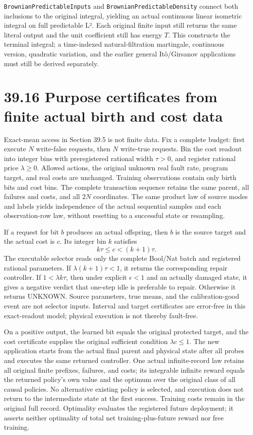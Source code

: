 \documentclass[
  english,
  11pt,
  oneside]{book}
\begin{document}
\nolinkurl{BrownianPredictableInputs} and \nolinkurl{BrownianPredictableDensity} connect both inclusions to the original integral, yielding an actual continuous linear isometric integral on full predictable L². Each original finite input still returns the same literal output and the unit coefficient still has energy \(T\). This constructs the terminal integral; a time-indexed natural-filtration martingale, continuous version, quadratic variation, and the earlier general Itô/Girsanov applications must still be derived separately.

\section{39.16 Purpose certificates from finite actual birth and cost data}\label{purpose-certificates-from-finite-actual-birth-and-cost-data}

Exact-mean access in Section 39.5 is not finite data. Fix a complete budget: first execute \(N\) write-false requests, then \(N\) write-true requests. Bin the cost readout into integer bins with preregistered rational width \(\tau>0\), and register rational price \(\lambda\ge0\). Allowed actions, the original unknown real fault rate, program target, and real costs are unchanged. Training observations contain only birth bits and cost bins. The complete transaction sequence retains the same parent, all failures and costs, and all \(2N\) coordinates. The same product law of source modes and labels yields independence of the actual sequential samples and each observation-row law, without resetting to a successful state or resampling.

If a request for bit \(b\) produces an actual offspring, then \(b\) is the source target and the actual cost is \(c\). Its integer bin \(k\) satisfies \[k\tau\le c<(k+1)\tau.\] The executable selector reads only the complete Bool/Nat batch and registered rational parameters. If \(\lambda(k+1)\tau<1\), it returns the corresponding repair controller. If \(1<\lambda k\tau\), then under explicit \(\epsilon<1\) and an actually damaged state, it gives a negative verdict that one-step idle is preferable to repair. Otherwise it returns UNKNOWN. Source parameters, true means, and the calibration-good event are not selector inputs. Interval and target certificates are error-free in this exact-readout model; physical execution is not thereby fault-free.

On a positive output, the learned bit equals the original protected target, and the cost certificate supplies the original sufficient condition \(\lambda c\le1\). The new application starts from the actual final parent and physical state after all probes and executes the same returned controller. One actual infinite-record law retains all original finite prefixes, failures, and costs; its integrable infinite reward equals the returned policy's own value and the optimum over the original class of all causal policies. No alternative existing policy is selected, and execution does not return to the intermediate state at the first success. Training costs remain in the original full record. Optimality evaluates the registered future deployment; it asserts neither optimality of total net training-plus-future reward nor free training.
\end{document}
